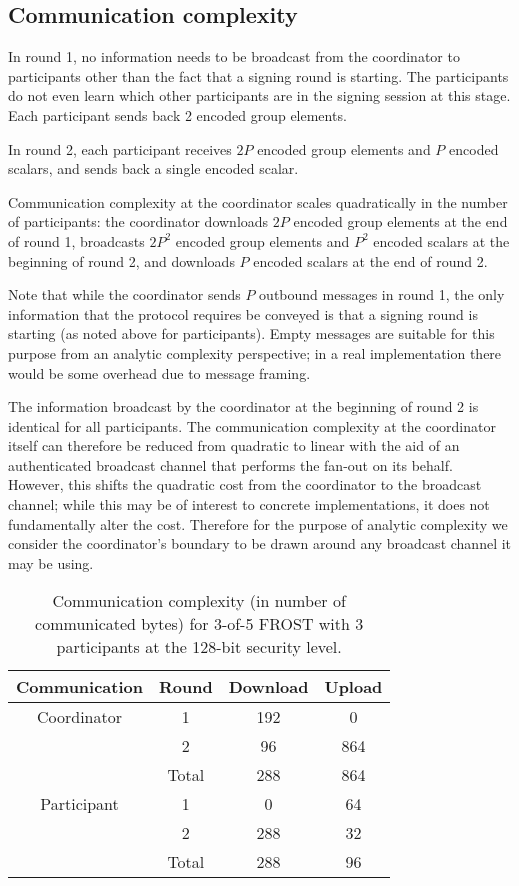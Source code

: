 \subsection{Communication complexity}

In round 1, no information needs to be broadcast from the coordinator to
participants other than the fact that a signing round is starting. The
participants do not even learn which other participants are in the signing
session at this stage. Each participant sends back 2 encoded group elements.

In round 2, each participant receives $2P$ encoded group elements and $P$
encoded scalars, and sends back a single encoded scalar.

Communication complexity at the coordinator scales quadratically in the number
of participants: the coordinator downloads $2P$ encoded group elements at
the end of round 1, broadcasts $2P^2$ encoded group elements and $P^2$ encoded
scalars at the beginning of round 2, and downloads $P$ encoded scalars at the
end of round 2.

Note that while the coordinator sends $P$ outbound messages in round 1, the only
information that the protocol requires be conveyed is that a signing round is
starting (as noted above for participants). Empty messages are suitable for this
purpose from an analytic complexity perspective; in a real implementation there
would be some overhead due to message framing.

The information broadcast by the coordinator at the beginning of round 2 is
identical for all participants. The communication complexity at the coordinator
itself can therefore be reduced from quadratic to linear with the aid of an
authenticated broadcast channel that performs the fan-out on its behalf.
However, this shifts the quadratic cost from the coordinator to the broadcast
channel; while this may be of interest to concrete implementations, it does not
fundamentally alter the cost. Therefore for the purpose of analytic complexity
we consider the coordinator's boundary to be drawn around any broadcast channel
it may be using.

\begin{table}
	\centering
	\begin{tabular}{c c c c}
		\toprule
		Communication & Round & Download & Upload \\ \midrule
		Coordinator & 1 & 192 & 0 \\
		            & 2 & 96 & 864 \\
		            & Total & 288 & 864 \\
		\midrule
		Participant & 1 & 0 & 64 \\
		            & 2 & 288 & 32 \\
		            & Total & 288 & 96 \\
		\bottomrule
	\end{tabular}
	\caption{Communication complexity (in number of communicated bytes) for 3-of-5 FROST with 3 participants at the 128-bit security level.}
\end{table}

